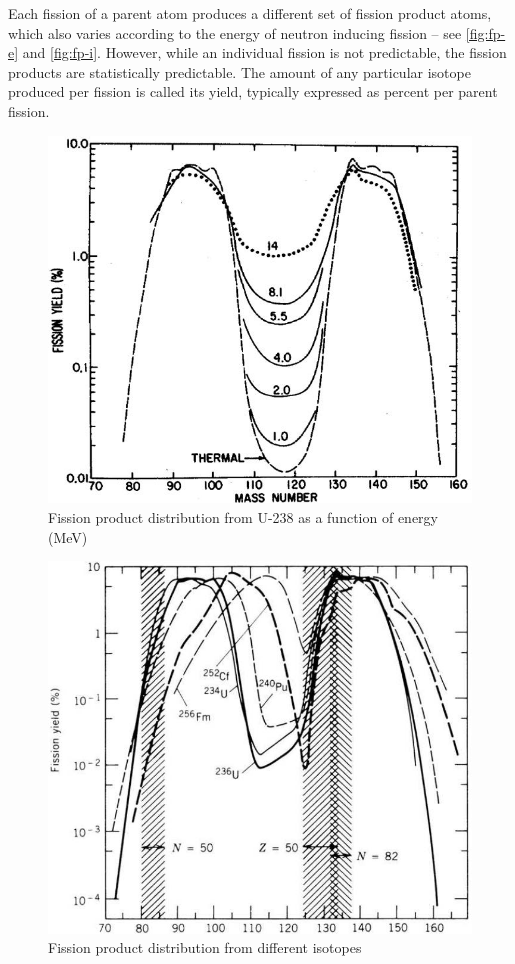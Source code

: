 \documentclass[12pt]{article}
\begin{document}
Each fission of a parent atom produces a different set of fission product atoms, which also varies according to the energy of neutron inducing fission -- see \autoref{fig:fp-e} and \autoref{fig:fp-i}. However, while an individual fission is not predictable, the fission products are statistically predictable. The amount of any particular isotope produced per fission is called its yield, typically expressed as percent per parent fission.

\begin{figure}
\centering
\includegraphics[scale=0.7]{../figs/FP_energy}
\caption{Fission product distribution from U-238 as a function of energy (MeV)}
\label{fig:fp-e}
\end{figure}
\begin{figure}
\centering
\includegraphics[scale=0.7]{../figs/FP_Isotope}
\caption{Fission product distribution from different isotopes}
\label{fig:fp-i}
\end{figure}
\end{document}
